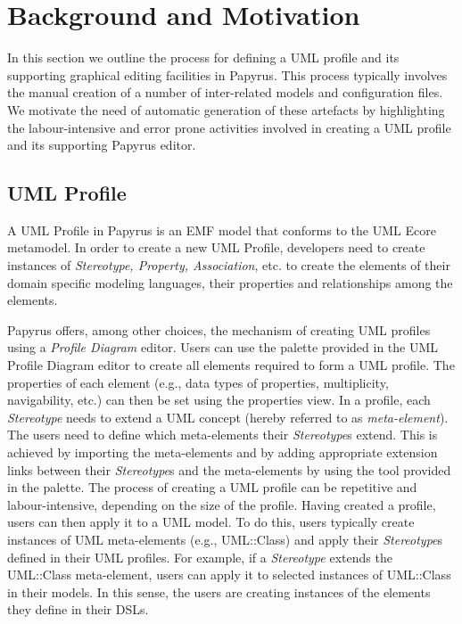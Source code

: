\section{Background and Motivation}
\label{sec:background}

In this section we outline the process for defining a UML profile and its supporting graphical editing facilities in Papyrus. 
This process typically involves the manual creation of a number of inter-related models and configuration files.
We motivate the need of automatic generation of these artefacts by highlighting the labour-intensive and error prone activities involved in creating a UML profile and its supporting Papyrus editor.

\subsection{UML Profile}
A UML Profile in Papyrus is an EMF model that conforms to the UML Ecore metamodel. 
In order to create a new UML Profile, developers need to create instances of \textit{Stereotype, Property, Association}, etc. to create the elements of their domain specific modeling languages, their properties and relationships among the elements.

Papyrus offers, among other choices, the mechanism of creating UML profiles using a \textit{Profile Diagram} editor. 
Users can use the palette provided in the UML Profile Diagram editor to create all elements required to form a UML profile.
The properties of each element (e.g., data types of properties, multiplicity, navigability, etc.) can then be set using the properties view. 
In a profile, each \textit{Stereotype} needs to extend a UML concept (hereby referred to as \textit{meta-element}). 
The users need to define which meta-elements their \textit{Stereotype}s extend. 
This is achieved by importing the meta-elements and by adding appropriate extension links between their \textit{Stereotype}s and the meta-elements by using the tool provided in the palette.
The process of creating a UML profile can be repetitive and labour-intensive, depending on the size of the profile.
Having created a profile, users can then apply it to a UML model. 
To do this, users typically create instances of UML meta-elements (e.g., UML::Class) and apply their \textit{Stereotype}s defined in their UML profiles. 
For example, if a \textit{Stereotype} extends the UML::Class meta-element, users can apply it to selected instances of UML::Class in their models. 
In this sense, the users are creating instances of the elements they define in their DSLs. 

